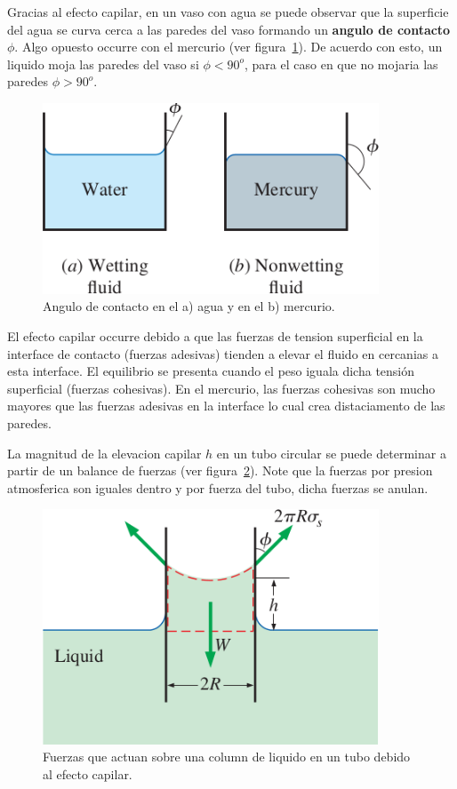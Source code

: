 \documentclass[10pt, oneside]{article}
\begin{document}
Gracias al efecto capilar, en un vaso con agua se puede observar que la superficie del agua se curva cerca a las paredes del vaso formando un \textbf{angulo de contacto} $\phi$. Algo opuesto occurre con el mercurio (ver figura~\ref{eca}). De acuerdo con esto, un liquido moja las paredes del vaso si $\phi < 90^o$, para el caso en que no mojaria las paredes $\phi > 90^o$. 

\begin{figure}[h]
\centering
\includegraphics[width=10cm]{ecangulo}
\caption{Angulo de contacto en el a) agua y en el b) mercurio.}
\label{eca}
\end{figure}

El efecto capilar occurre debido a que las fuerzas de tension superficial en la interface de contacto (fuerzas adesivas) tienden a elevar el fluido en cercanias a esta interface. El equilibrio se presenta cuando el peso iguala dicha tensi\'on superficial (fuerzas cohesivas). En el mercurio, las fuerzas cohesivas son mucho mayores que las fuerzas adesivas en la interface lo cual crea distaciamento de las paredes.  

La magnitud de la elevacion capilar $h$  en un tubo circular se puede determinar a partir de un balance de fuerzas (ver figura~\ref{ecfu}). Note que la fuerzas por presion atmosferica son iguales dentro y por fuerza del tubo, dicha fuerzas se anulan.  

\begin{figure}[h]
\centering
\includegraphics[width=10cm]{ecfuer}
\caption{Fuerzas que actuan sobre una column de liquido en un tubo debido al efecto capilar.}
\label{ecfu}
\end{figure}
\end{document}
